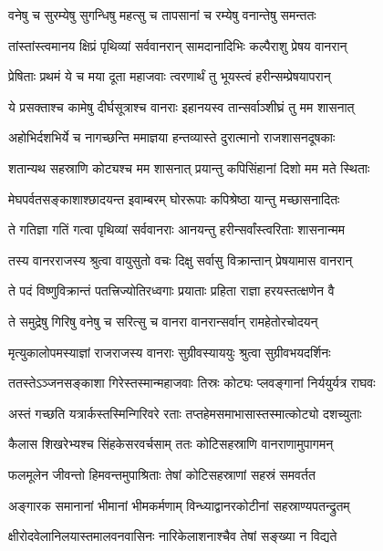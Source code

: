 \twolineshloka
{वनेषु च सुरम्येषु सुगन्धिषु महत्सु च}
{तापसानां च रम्येषु वनान्तेषु समन्ततः} %

\twolineshloka
{तांस्तांस्त्वमानय क्षिप्रं पृथिव्यां सर्ववानरान्}
{सामदानादिभिः कल्पैराशु प्रेषय वानरान्} %

\twolineshloka
{प्रेषिताः प्रथमं ये च मया दूता महाजवाः}
{त्वरणार्थं तु भूयस्त्वं हरीन्सम्प्रेषयापरान्} %

\twolineshloka
{ये प्रसक्ताश्च कामेषु दीर्घसूत्राश्च वानराः}
{इहानयस्व तान्सर्वाञ्शीघ्रं तु मम शासनात्} %

\twolineshloka
{अहोभिर्दशभिर्ये च नागच्छन्ति ममाज्ञया}
{हन्तव्यास्ते दुरात्मानो राजशासनदूषकाः} %

\twolineshloka
{शतान्यथ सहस्राणि कोट्यश्च मम शासनात्}
{प्रयान्तु कपिसिंहानां दिशो मम मते स्थिताः} %

\twolineshloka
{मेघपर्वतसङ्काशाश्छादयन्त इवाम्बरम्}
{घोररूपाः कपिश्रेष्ठा यान्तु मच्छासनादितः} %

\twolineshloka
{ते गतिज्ञा गतिं गत्वा पृथिव्यां सर्ववानराः}
{आनयन्तु हरीन्सर्वांस्त्वरिताः शासनान्मम} %

\twolineshloka
{तस्य वानरराजस्य श्रुत्वा वायुसुतो वचः}
{दिक्षु सर्वासु विक्रान्तान् प्रेषयामास वानरान्} %

\twolineshloka
{ते पदं विष्णुविक्रान्तं पतत्त्रिज्योतिरध्वगाः}
{प्रयाताः प्रहिता राज्ञा हरयस्तत्क्षणेन वै} %

\twolineshloka
{ते समुद्रेषु गिरिषु वनेषु च सरित्सु च}
{वानरा वानरान्सर्वान् रामहेतोरचोदयन्} %

\twolineshloka
{मृत्युकालोपमस्याज्ञां राजराजस्य वानराः}
{सुग्रीवस्याययुः श्रुत्वा सुग्रीवभयदर्शिनः} %

\twolineshloka
{ततस्तेऽञ्जनसङ्काशा गिरेस्तस्मान्महाजवाः}
{तिस्रः कोट्यः प्लवङ्गानां निर्ययुर्यत्र राघवः} %

\twolineshloka
{अस्तं गच्छति यत्रार्कस्तस्मिन्गिरिवरे रताः}
{तप्तहेमसमाभासास्तस्मात्कोट्यो दशच्युताः} %

\twolineshloka
{कैलास शिखरेभ्यश्च सिंहकेसरवर्चसाम्}
{ततः कोटिसहस्राणि वानराणामुपागमन्} %

\twolineshloka
{फलमूलेन जीवन्तो हिमवन्तमुपाश्रिताः}
{तेषां कोटिसहस्राणां सहस्रं समवर्तत} %

\twolineshloka
{अङ्गारक समानानां भीमानां भीमकर्मणाम्}
{विन्ध्याद्वानरकोटीनां सहस्राण्यपतन्द्रुतम्} %

\twolineshloka
{क्षीरोदवेलानिलयास्तमालवनवासिनः}
{नारिकेलाशनाश्चैव तेषां सङ्ख्या न विद्यते} %

